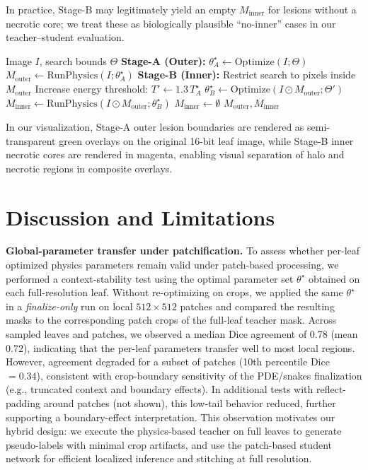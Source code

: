\documentclass[11pt,a4paper]{article}
\begin{document}
In practice, Stage-B may legitimately yield an empty $M_{\text{inner}}$ for lesions without a necrotic core; we treat these as biologically plausible ``no-inner'' cases in our teacher--student evaluation.

\begin{algorithm}
\caption{Two-Stage Nested Lesion Inference}
\label{alg:two_stage}
\begin{algorithmic}[1]
\REQUIRE Image $I$, search bounds $\Theta$
\STATE \textbf{Stage-A (Outer):} $\theta_A^\star \leftarrow \mathrm{Optimize}(I;\Theta)$
\STATE $M_{\text{outer}} \leftarrow \mathrm{RunPhysics}(I;\theta_A^\star)$ 
    \STATE \textbf{Stage-B (Inner):} Restrict search to pixels inside $M_{\text{outer}}$
    \STATE Increase energy threshold: $T' \leftarrow 1.3\,T_A^\star$
    \STATE $\theta_B^\star \leftarrow \mathrm{Optimize}(I \odot M_{\text{outer}};\Theta')$
    \STATE $M_{\text{inner}} \leftarrow \mathrm{RunPhysics}(I \odot M_{\text{outer}};\theta_B^\star)$ 
\ELSE
    \STATE $M_{\text{inner}} \leftarrow \emptyset$
\ENDIF
\RETURN $M_{\text{outer}}, M_{\text{inner}}$
\end{algorithmic}
\end{algorithm}

In our visualization, Stage-A outer lesion boundaries are rendered as semi-transparent green overlays on the original 16-bit leaf image, while Stage-B inner necrotic cores are rendered in magenta, enabling visual separation of halo and necrotic regions in composite overlays.

\section{Discussion and Limitations}

\textbf{Global-parameter transfer under patchification.}
To assess whether per-leaf optimized physics parameters remain valid under patch-based processing, we performed a context-stability test using the optimal parameter set $\theta^\star$ obtained on each full-resolution leaf. Without re-optimizing on crops, we applied the same $\theta^\star$ in a \emph{finalize-only} run on local $512\times512$ patches and compared the resulting masks to the corresponding patch crops of the full-leaf teacher mask. Across sampled leaves and patches, we observed a median Dice agreement of $0.78$ (mean $0.72$), indicating that the per-leaf parameters transfer well to most local regions. However, agreement degraded for a subset of patches (10th percentile Dice $=0.34$), consistent with crop-boundary sensitivity of the PDE/snakes finalization (e.g., truncated context and boundary effects). In additional tests with reflect-padding around patches (not shown), this low-tail behavior reduced, further supporting a boundary-effect interpretation. This observation motivates our hybrid design: we execute the physics-based teacher on full leaves to generate pseudo-labels with minimal crop artifacts, and use the patch-based student network for efficient localized inference and stitching at full resolution.
\end{document}
